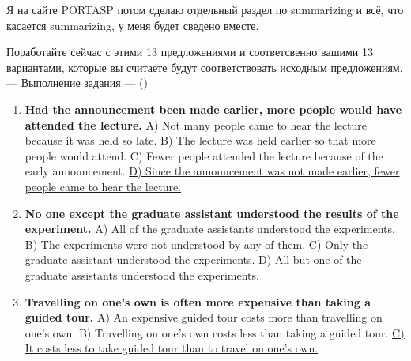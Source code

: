 \documentclass[main.tex]{subfiles}
\begin{document}
\newpage
{}

Я на сайте PORTASP потом сделаю отдельный раздел по summarizing и всё, что касается summarizing, у меня будет сведено вместе.

Поработайте сейчас с этими 13 предложениями и соответсвенно вашими 13 вариантами, которые вы считаете будут соответствовать исходным предложениям.
\\

\hypertarget{ltask:2024-03-27}{--- Выполнение задания ---} (\hyperref[task:2024-03-27]{\color{blue}{перейти к тексту задания}})
\\

\vspace{5pt}
\begin{enumerate}[nosep, leftmargin=*]
	\itemsep15pt
	\item \textbf{Had the announcement been made earlier, more people would have attended the lecture.}\newline
		A) Not many people came to hear the lecture because it was held so late.\newline
		B) The lecture was held earlier so that more people would attend.\newline
		C) Fewer people attended the lecture because of the early announcement.\newline
		\uline{D) Since the announcement was not made earlier, fewer people came to hear the lecture.}
	\item \textbf{No one except the graduate assistant understood the results of the experiment.}\newline
		A) All of the graduate assistants understood the experiments.\newline
		B) The experiments were not understood by any of them.\newline
		\uline{C) Only the graduate assistant understood the experiments.}\newline
		D) All but one of the graduate assistants understood the experiments.
	\item \textbf{Travelling on one's own is often more expensive than taking a guided tour.}\newline
		A) An expensive guided tour costs more than travelling on one's own.\newline
		B) Travelling on one's own costs less than taking a guided tour.\newline
		\uline{C) It costs less to take guided tour than to travel on one's own.}\newline

\end{enumerate}
\end{document}
